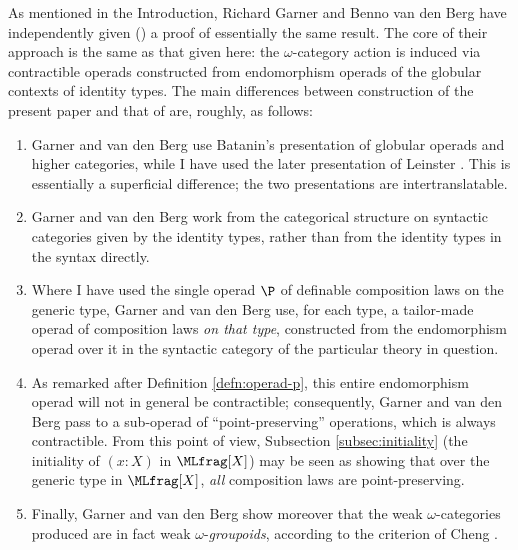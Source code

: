\begin{rem}  As mentioned in the Introduction, Richard Garner and Benno van den Berg have independently given (\cite{benno-richard}) a proof of essentially the same result.  The core of their approach is the same as that given here: the $\omega$-category action is induced via contractible operads constructed from endomorphism operads of the globular contexts of identity types.  The main differences between construction of the present paper and that of \cite{benno-richard} are, roughly, as follows:

\begin{enumerate}[(1)]
\item Garner and van den Berg use Batanin's presentation \cite{batanin:natural-environment} of globular operads and higher categories, while I have used the later presentation of Leinster \cite{leinster:book}.  This is essentially a superficial difference; the two presentations  are intertranslatable.
\item  Garner and van den Berg work from the categorical structure on syntactic categories given by the identity types, rather than from the identity types in the syntax directly.
\item  Where I have used the single operad $\P$ of definable composition laws on the generic type, Garner and van den Berg use, for each type, a tailor-made operad of composition laws \emph{on that type}, constructed from the endomorphism operad over it in the syntactic category of the particular theory in question.
\item  As remarked after Definition \ref{defn:operad-p}, this entire endomorphism operad will not in general be contractible; consequently, Garner and van den Berg pass to a sub-operad of ``point-preserving'' operations, which is always contractible.  From this point of view, Subsection \ref{subsec:initiality} (the initiality of $(x:X)$ in $\MLfrag[X]$) may be seen as showing that over the generic type in $\MLfrag[X]$, \emph{all} composition laws are point-preserving.
\item  Finally, Garner and van den Berg show moreover that the weak $\omega$-categories produced are in fact weak $\omega$-\emph{groupoids}, according to the criterion of Cheng \cite{cheng:duals-give-inverses}.
\end{enumerate}
\end{rem}

